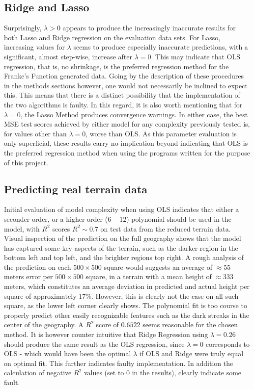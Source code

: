 \documentclass[%
oneside,                 %
final,                   %
10pt]{article}
\begin{document}
\subsection{Ridge and Lasso}
Surprisingly, $\lambda > 0$ appears to produce the increasingly inaccurate results for both Lasso and Ridge regression on the evaluation data sets. For Lasso, increasing values for $\lambda$ seems to produce especially inaccurate predictions, with a significant, almost step-wise, increase after $\lambda=0$. This may indicate that OLS regression, that is, no shrinkage, is the preferred regression method for the Franke's Function generated data. Going by the description of these procedures in the methods sections however, one would not necessarily be inclined to expect this. This means that there is a distinct possibility that the implementation of the two algorithms is faulty. In this regard, it is also worth mentioning that for $\lambda=0$, the Lasso Method produces convergence warnings. In either case, the best MSE test scores achieved by either model for any complexity previously tested is, for values other than $\lambda=0$, worse than OLS. As this parameter evaluation is only superficial, these results carry no implication beyond indicating that OLS is the preferred regression method when using the programs written for the purpose of this project. 

\subsection{Predicting real terrain data}
Initial evaluation of model complexity when using OLS indicates that either a seconder order, or a higher order ($6-12$) polynomial should be used in the model, with $R^2$ scores $R^2\sim 0.7$ on test data from the reduced terrain data. Visual inspection of the prediction on the full geography shows that the model has captured some key aspects of the terrain, such as the darker region in the bottom left and top left, and the brighter regions top right. A rough analysis of the prediction on each $500 \times 500$ square would suggests an average of $\approx 55$ meters error per $500 \times 500$ square, in a terrain with a mean height of $\approx 333$ meters, which constitutes an average deviation in predicted and actual height per square of approximately $17\%$. However, this is clearly not the case on all such square, as the lower left corner clearly shows. The polynomial fit is too course to properly predict other easily recognizable features such as the dark streaks in the center of the geography. A $R^2$ score of $0.6522$ seems reasonable for the chosen method. It is however counter intuitive that Ridge Regression using $\lambda=0.26$ should produce the same result as the OLS regression, since $\lambda=0$ corresponds to OLS - which would have been the optimal $\lambda$ if OLS and Ridge were truly equal on optimal fit. This further indicates faulty implementation. In addition the calculation of negative $R^2$ values (set to 0 in the results), clearly indicate some fault.
\end{document}
